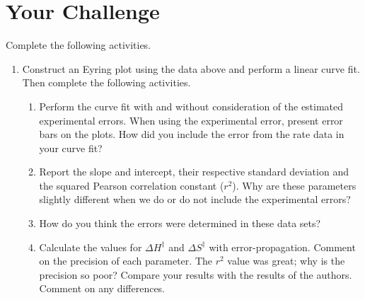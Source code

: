 \documentclass{tufte-handout}
\begin{document}
\clearpage

\section{Your Challenge}

Complete the following activities.

\begin{enumerate}
\item Construct an Eyring plot using the data above and perform a linear curve fit. Then complete the following activities.

\begin{enumerate}
\item Perform the curve fit with and without consideration of the estimated experimental errors. When using the experimental error, present error bars on the plots. How did you include the error from the rate data in your curve fit?

\item Report the slope and intercept, their respective standard deviation and the squared Pearson correlation constant ($r^2$). Why are these parameters slightly different when we do or do not include the exp\-er\-i\-ment\-al errors?

\item How do you think the errors were determined in these data sets?

\item Calculate the values for $\Delta H^\ddagger$ and $\Delta S^\ddagger$ with error-propagation.
Com\-ment on the precision of each parameter. The $r^2$ value was great; why is the precision so poor? Compare your results with the results of the authors. Comment on any differences.


\end{enumerate}
\end{enumerate}
\end{document}
